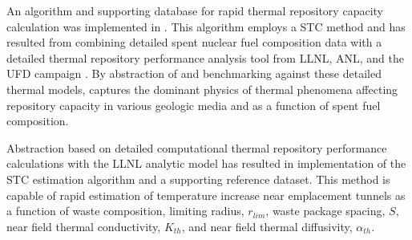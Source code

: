 
An algorithm and supporting database for rapid thermal repository capacity 
calculation was implemented in \Cyder.  This algorithm employs a \gls{STC} 
method \cite{radel_effect_2007, radel_repository_2007} and has resulted from 
combining detailed spent nuclear fuel composition data \cite{carter_fuel_2011} 
with a detailed thermal repository performance analysis tool from \gls{LLNL}, 
\gls{ANL}, and the \gls{UFD} campaign \cite{greenberg_application_2012}. By abstraction of 
and benchmarking against these detailed thermal models, \Cyder captures the 
dominant physics of thermal phenomena affecting repository capacity in various 
geologic media and as a function of spent fuel composition.

Abstraction based on detailed computational thermal repository performance 
calculations with the \gls{LLNL} analytic model has resulted in implementation 
of the \gls{STC} estimation algorithm and a supporting reference dataset.  This 
method is capable of rapid estimation of temperature increase near emplacement 
tunnels as a function of waste composition, limiting radius, $r_{lim}$, waste 
package spacing, $S$, near field thermal conductivity, $K_{th}$, and near field 
thermal diffusivity, $\alpha_{th}$.
